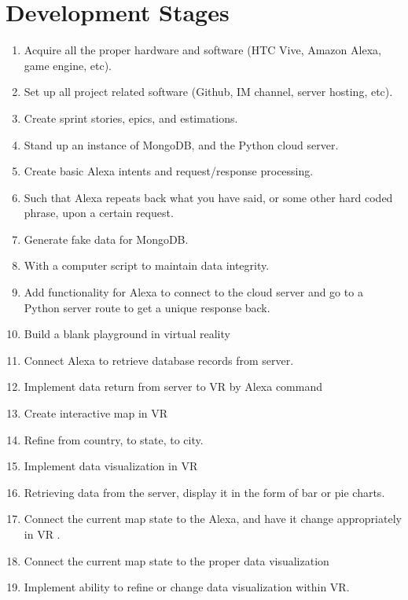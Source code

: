 \documentclass[onecolumn, draftclsnofoot,10pt, compsoc]{IEEEtran}
\begin{document}
\section{Development Stages}
    \begin{enumerate}
        \item Acquire all the proper hardware and software (HTC Vive, Amazon Alexa, game engine, etc). 
        \item Set up all project related software (Github, IM channel, server hosting, etc).
        \item Create sprint stories, epics, and estimations.
        \item Stand up an instance of MongoDB, and the Python cloud server. 
        \item Create basic Alexa intents and request/response processing.
        \item Such that Alexa repeats back what you have said, or some other hard coded phrase, upon a certain request. 
        \item Generate fake data for MongoDB.
        \item With a computer script to maintain data integrity. 
        \item Add functionality for Alexa to connect to the cloud server and go to a Python server route to get a unique response back. 
        \item Build a blank playground in virtual reality
        \item Connect Alexa to retrieve database records from server.
        \item Implement data return from server to VR by Alexa command
        \item Create interactive map in VR 
        \item Refine from country, to state, to city.
        \item Implement data visualization in VR
        \item Retrieving data from the server, display it in the form of bar or pie charts. 
        \item Connect the current map state to the Alexa, and have it change appropriately in VR .
        \item Connect the current map state to the proper data visualization 
        \item Implement ability to refine or change data visualization within VR.
    \end{enumerate}
\end{document}
